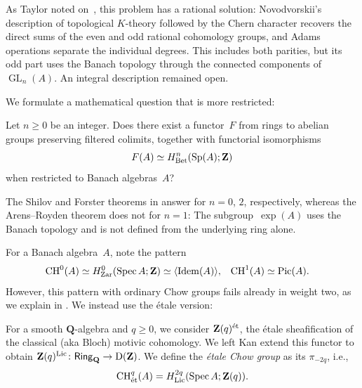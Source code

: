 \documentclass[11pt,a4paper]{amsart}
\newcommand{\cref}[1]{\zcref{#1}}
\numberwithin{equation}{section}
\theoremstyle{plain}
\theoremstyle{definition}
\theoremstyle{remark}
\newcommand{\ZZ}{\mathbf{Z}}
\newcommand{\QQ}{\mathbf{Q}}
\newcommand{\Lic}{\textnormal{Lic}}
\newcommand{\Zar}{\textnormal{Zar}}
\newcommand{\et}{\textnormal{ét}}
\newcommand{\Bet}{\textnormal{Bet}}
\newcommand{\CH}{\operatorname{CH}}
\newcommand{\D}{\operatorname{D}}
\newcommand{\GL}{\operatorname{GL}}
\newcommand{\Idem}{\operatorname{Idem}}
\newcommand{\Pic}{\operatorname{Pic}}
\newcommand{\Spec}{\operatorname{Spec}}
\newcommand{\Sp}{\operatorname{Sp}}
\newcommand{\Cat}[1]{\mathsf{#1}}
\begin{document}
As Taylor noted on~\cite[page~117]{Taylor75},
this problem has a rational solution:
Novodvorskii’s description of topological \(K\)-theory followed by the
Chern character recovers the direct sums of the even and odd rational
cohomology groups, and Adams operations separate the individual degrees.
This includes both parities, but its odd part uses
the Banach topology through the connected components of~\(\GL_n(A)\).
An integral description remained open.

We formulate a mathematical question
that is more restricted:

\begin{question}\label{taylor}
  Let \(n\geq0\) be an integer.
  Does there exist a
  functor~\(F\) from rings to
  abelian groups preserving filtered colimits,
  together with functorial isomorphisms
  \begin{equation*}
    F(A)\simeq H^n_{\Bet}(\Sp(A);\ZZ)
  \end{equation*}
  when restricted to Banach algebras~\(A\)?
\end{question}

\begin{remark}\label{ar}
  The Shilov and Forster theorems in \cref{classical}
  answer \cref{taylor} for \(n=0\), \(2\), respectively,
  whereas the Arens–Royden theorem
  does not for \(n=1\):
  The subgroup~\(\exp(A)\) uses the Banach topology
  and is not defined from
  the underlying ring alone.
\end{remark}

For a Banach algebra~\(A\), note
the pattern
\begin{align*}
  \CH^{0}(A)&\simeq H^{0}_{\Zar}(\Spec A;\ZZ)
  \simeq\langle\Idem(A)\rangle,&
  \CH^{1}(A)&\simeq\Pic(A).
\end{align*}
However,
this pattern with ordinary Chow groups fails already in weight two,
as we explain in \cref{s:ordinary}.
We instead use the étale version:

\begin{definition}\label{etale}
  For a smooth \(\QQ\)-algebra and \(q\geq0\),
  we consider \(\ZZ(q)^{\et}\),
  the étale sheafification
  of the classical (aka Bloch) motivic cohomology.
  We left Kan extend this functor to obtain
  \(\ZZ(q)^{\Lic}\colon\Cat{Ring}_{\QQ}\to\D(\ZZ)\).
  We define the \emph{étale Chow group}
  as its \(\pi_{-2q}\), i.e.,
  \begin{equation*}
    \CH^q_{\et}(A)=H_{\Lic}^{2q}(\Spec A;\ZZ(q)).
  \end{equation*}
\end{definition}
\end{document}
